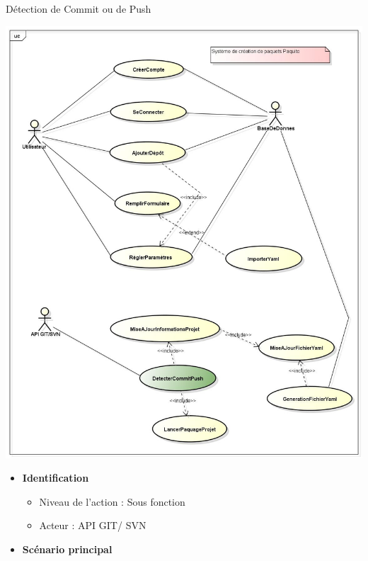 \documentclass[9pt,xcolor=dvipsnames]{beamer}
\begin{document}
\begin{frame}{Détection de Commit ou de Push}
  \begin{minipage}{0.40\textwidth}
    \begin{flushleft}
      \includegraphics[scale=\largeur]{../img/Diagram_detecterCommitPush.jpg}
    \end{flushleft}
  \end{minipage}
  \hfill
  \begin{minipage}{0.5\textwidth}
    \begin{flushright}
      \begin{itemize}
      \item \textbf{Identification}
        \begin{itemize}
        \item[] Niveau de l'action : Sous fonction
        \item[] Acteur : API GIT/ SVN
        \end{itemize}
      \item \textbf{Scénario principal}

\end{itemize}
\end{flushright}
\end{minipage}
\end{frame}
\end{document}

